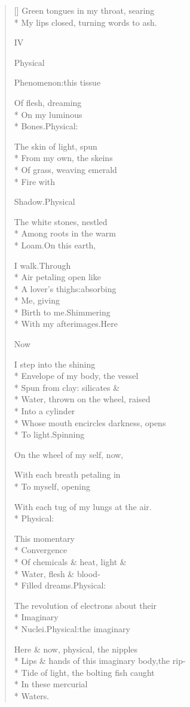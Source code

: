 \begin{verse}[\versewidth]
Green tongues in my throat, searing\\*
My lips closed, turning words to ash.

\hspace{0.45\versewidth} IV

Physical

Phenomenon:\quad this tissue

Of flesh, dreaming\\*
On my luminous\\*
Bones.\quad Physical:

The skin of light, spun\\*
From my own, the skeins\\*
Of grass, weaving emerald\\*
Fire with

Shadow.\quad Physical

The white stones, nestled\\*
Among roots in the warm\\*
Loam.\quad On this earth,

I walk.\quad Through\\*
Air petaling open like\\*
A lover's thighs:\quad absorbing\\*
Me, giving\\*
Birth to me.\quad Shimmering\\*
With my afterimages.\quad Here

Now

I step into the shining\\*
Envelope of my body, the vessel\\*
Spun from clay: silicates \&\\*
Water, thrown on the wheel, raised\\*
Into a cylinder\\*
Whose mouth encircles darkness, opens\\*
To light.\quad Spinning

On the wheel of my self, now,

With each breath petaling in\\*
To myself, opening

With each tug of my lungs at the air.\\*
Physical:

This momentary\\*
Convergence\\*
Of chemicals \& heat, light \&\\*
Water, flesh \& blood-\\*
Filled dreams.\quad Physical:

The revolution of electrons about their\\*
Imaginary\\*
Nuclei.\quad Physical:\quad the imaginary

Here \& now, physical, the nipples\\*
Lips \& hands of this imaginary body,\quad the rip-\\*
Tide of light, the bolting fish caught\\*
In these mercurial\\*
Waters.
\end{verse}
\endgroup